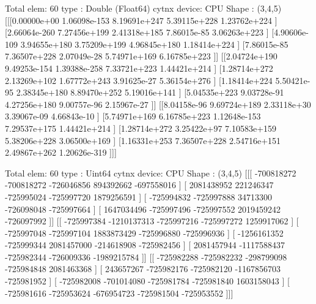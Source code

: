 \begin{DoxyVerbInclude}

Total elem: 60
type  : Double (Float64)
cytnx device: CPU
Shape : (3,4,5)
[[[0.00000e+00 1.06098e-153 8.19691e+247 5.39115e+228 1.23762e+224 ]
  [2.66064e-260 7.27456e+199 2.41318e+185 7.86015e-85 3.06263e+223 ]
  [4.90606e-109 3.94655e+180 3.75209e+199 4.96845e+180 1.18414e+224 ]
  [7.86015e-85 7.36507e+228 2.07049e-28 5.74971e+169 6.16785e+223 ]]
 [[2.04724e+190 9.49253e-154 1.39388e-258 7.33721e+223 1.44421e+214 ]
  [1.28714e+272 2.13269e+102 1.67772e+243 3.91625e-27 5.36154e+276 ]
  [1.18414e+224 5.50421e-95 2.38345e+180 8.89470e+252 5.19016e+141 ]
  [5.04535e+223 9.03728e-91 4.27256e+180 9.00757e-96 2.15967e-27 ]]
 [[8.04158e-96 9.69724e+189 2.33118e+30 3.39067e-09 4.66843e-10 ]
  [5.74971e+169 6.16785e+223 1.12648e-153 7.29537e+175 1.44421e+214 ]
  [1.28714e+272 3.25422e+97 7.10583e+159 5.38206e+228 3.06500e+169 ]
  [1.16331e+253 7.36507e+228 2.54716e+151 2.49867e+262 1.20626e-319 ]]]



Total elem: 60
type  : Uint64
cytnx device: CPU
Shape : (3,4,5)
[[[         -700818272          -700818272          -726046856           894392662          -697558016 ]
  [         2081438952           221246347          -725995024          -725997720          1879256591 ]
  [         -725994832          -725997888            34713300          -726098048          -725997664 ]
  [         1647034496          -725997496          -725997552          2019459242          -726097992 ]]
 [[         -725997384         -1210137313          -725997216          -725997272          1259917062 ]
  [         -725997048          -725997104          1883873429          -725996880          -725996936 ]
  [        -1256161352          -725999344          2081457000          -214618908          -725982456 ]
  [         2081457944         -1117588437          -725982344          -726009336         -1989215784 ]]
 [[         -725982288          -725982232          -298799098          -725984848          2081463368 ]
  [          243657267          -725982176          -725982120         -1167856703          -725981952 ]
  [         -725982008          -701014080          -725981784          -725981840          1603158043 ]
  [         -725981616          -725953624          -676954723          -725981504          -725953552 ]]]




\end{DoxyVerbInclude}
